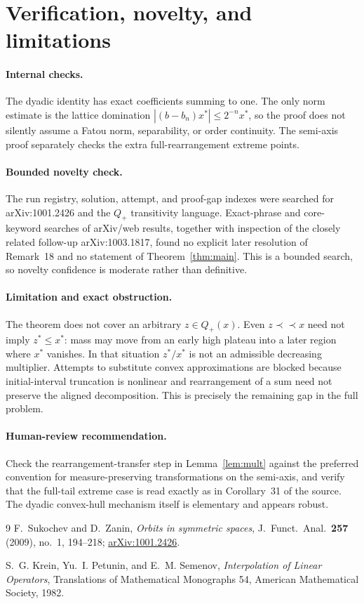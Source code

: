 \documentclass[11pt]{article}
\newcommand{\Qp}{Q_{+}}
\begin{document}
\section{Verification, novelty, and limitations}

\paragraph{Internal checks.}
The dyadic identity has exact coefficients summing to one.  The only norm
estimate is the lattice domination
$|(b-b_n)x^*|\leq2^{-n}x^*$, so the proof does not silently assume a Fatou
norm, separability, or order continuity.  The semi-axis proof separately
checks the extra full-rearrangement extreme points.

\paragraph{Bounded novelty check.}
The run registry, solution, attempt, and proof-gap indexes were searched for
arXiv:1001.2426 and the $Q_+$ transitivity language.  Exact-phrase and
core-keyword searches of arXiv/web results, together with inspection of the
closely related follow-up arXiv:1003.1817, found no explicit later resolution
of Remark~18 and no statement of Theorem~\ref{thm:main}.  This is a bounded
search, so novelty confidence is moderate rather than definitive.

\paragraph{Limitation and exact obstruction.}
The theorem does not cover an arbitrary $z\in\Qp(x)$.  Even
$z\prec\!\prec x$ need not imply $z^*\leq x^*$: mass may move from an early
high plateau into a later region where $x^*$ vanishes.  In that situation
$z^*/x^*$ is not an admissible decreasing multiplier.  Attempts to substitute
convex approximations are blocked because initial-interval truncation is
nonlinear and rearrangement of a sum need not preserve the aligned
decomposition.  This is precisely the remaining gap in the full problem.

\paragraph{Human-review recommendation.}
Check the rearrangement-transfer step in Lemma~\ref{lem:mult} against the
preferred convention for measure-preserving transformations on the
semi-axis, and verify that the full-tail extreme case is read exactly as in
Corollary~31 of the source.  The dyadic convex-hull mechanism itself is
elementary and appears robust.

\begin{thebibliography}{9}
F.~Sukochev and D.~Zanin,
\emph{Orbits in symmetric spaces},
J.\ Funct.\ Anal.\ \textbf{257} (2009), no.~1, 194--218;
\href{https://arxiv.org/abs/1001.2426}{arXiv:1001.2426}.

S.~G. Krein, Yu.~I. Petunin, and E.~M. Semenov,
\emph{Interpolation of Linear Operators},
Translations of Mathematical Monographs 54, American Mathematical Society,
1982.
\end{thebibliography}
\end{document}

